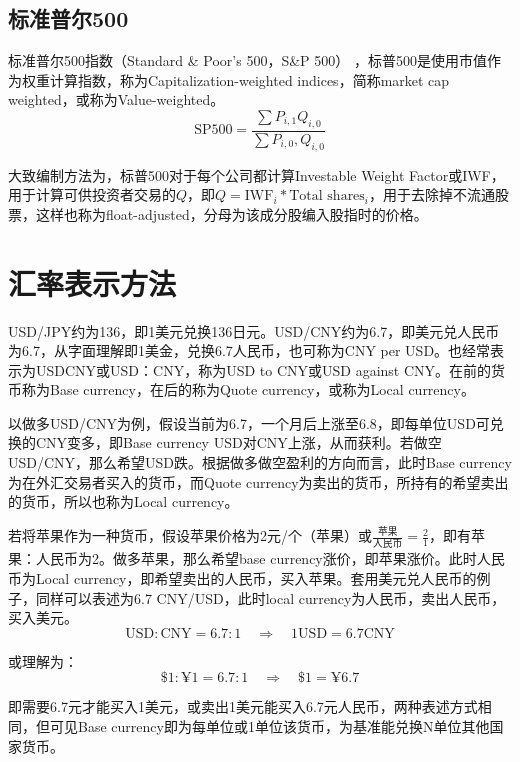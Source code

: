 \documentclass[11pt]{article}
\begin{document}
\begin{appendices}
\subsection{标准普尔500}

标准普尔500指数（Standard \& Poor's 500，S\&P 500） ，标普500是使用市值作为权重计算指数，称为Capitalization-weighted indices，简称market cap weighted，或称为Value-weighted。
\begin{equation*}
    \text{SP500} = \frac{\sum P_{i,1} Q_{i,0}}{\sum P_{i,0}, Q_{i,0}}
\end{equation*}

大致编制方法为，标普500对于每个公司都计算Investable Weight Factor或IWF，用于计算可供投资者交易的$Q$，即$Q=\text{IWF}_i * \text{Total shares}_i$，用于去除掉不流通股票，这样也称为float-adjusted，分母为该成分股编入股指时的价格。

\section{汇率表示方法}

USD/JPY约为136，即1美元兑换136日元。USD/CNY约为6.7，即美元兑人民币为6.7，从字面理解即1美金，兑换6.7人民币，也可称为CNY per USD。也经常表示为USDCNY或USD：CNY，称为USD to CNY或USD against CNY。在前的货币称为Base currency，在后的称为Quote currency，或称为Local currency。

以做多USD/CNY为例，假设当前为6.7，一个月后上涨至6.8，即每单位USD可兑换的CNY变多，即Base currency USD对CNY上涨，从而获利。若做空USD/CNY，那么希望USD跌。根据做多做空盈利的方向而言，此时Base currency为在外汇交易者买入的货币，而Quote currency为卖出的货币，所持有的希望卖出的货币，所以也称为Local currency。

若将苹果作为一种货币，假设苹果价格为2元/个（苹果）或$\frac{\text{苹果}}{\text{人民币}}= \frac{2}{1}$，即有苹果：人民币为2。做多苹果，那么希望base currency涨价，即苹果涨价。此时人民币为Local currency，即希望卖出的人民币，买入苹果。套用美元兑人民币的例子，同样可以表述为6.7 CNY/USD，此时local currency为人民币，卖出人民币，买入美元。
\begin{equation*}
    \text{USD} : \text{CNY} = 6.7:1 \quad \Rightarrow \quad 1 \text{USD} = 6.7 \text{CNY}
\end{equation*}

或理解为：
\begin{equation*}
    \$1 : \yen 1 = 6.7:1 \quad \Rightarrow \quad  \$ 1 = \yen 6.7
\end{equation*}

即需要6.7元才能买入1美元，或卖出1美元能买入6.7元人民币，两种表述方式相同，但可见Base currency即为每单位或1单位该货币，为基准能兑换N单位其他国家货币。


\end{appendices}
\end{document}
